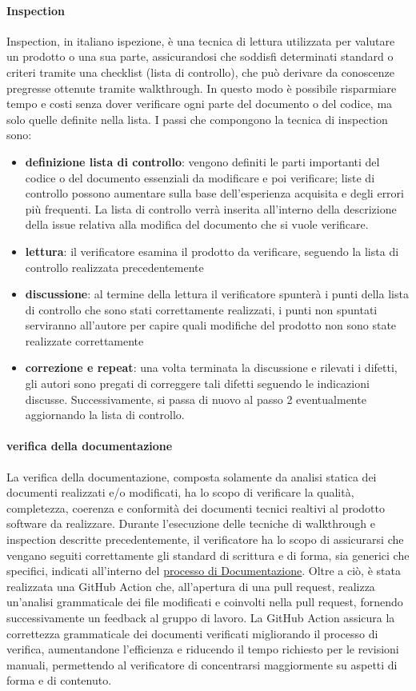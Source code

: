 \paragraph{Inspection}
Inspection, in italiano ispezione, è una tecnica di lettura utilizzata per valutare un prodotto o una sua parte, assicurandosi che soddisfi determinati standard o criteri tramite una checklist (lista di controllo), 
che può derivare da conoscenze pregresse ottenute tramite walkthrough.
In questo modo è possibile risparmiare tempo e costi senza dover verificare ogni parte del documento o del codice, ma solo quelle definite nella lista.
I passi che compongono la tecnica di inspection sono: 
\begin{itemize}
    \item \textbf{definizione lista di controllo}:  vengono definiti le parti importanti del codice o del documento essenziali da modificare e poi verificare; liste di controllo possono aumentare sulla base dell'esperienza acquisita e degli errori più frequenti. 
    La lista di controllo verrà inserita all'interno della descrizione della issue relativa alla modifica del documento che si vuole verificare.
    \item \textbf{lettura}: il verificatore esamina il prodotto da verificare, seguendo la lista di controllo realizzata precedentemente
    \item \textbf{discussione}: al termine della lettura il verificatore spunterà i punti della lista di controllo che sono stati correttamente realizzati, i punti non spuntati serviranno all'autore per capire quali modifiche del prodotto non sono state realizzate correttamente
    \item \textbf{correzione e repeat}:  una volta terminata la discussione e rilevati i difetti, gli autori sono pregati di correggere tali difetti seguendo le indicazioni discusse. Successivamente, si passa di nuovo al passo 2 eventualmente aggiornando la lista di controllo.
\end{itemize}
\paragraph{verifica della documentazione}
La verifica della documentazione, composta solamente da analisi statica dei documenti realizzati e/o modificati, ha lo scopo di verificare
la qualità, completezza, coerenza e conformità dei documenti tecnici realtivi al prodotto software da realizzare.
Durante l'esecuzione delle tecniche di walkthrough e inspection descritte precedentemente, il verificatore ha lo scopo di 
assicurarsi che vengano seguiti correttamente gli standard di scrittura e di forma, sia generici che specifici, indicati all'interno
del \hyperref[subsec:documentazione]{processo di Documentazione}.
Oltre a ciò, è stata realizzata una GitHub Action che, all'apertura di una pull request, realizza un'analisi grammaticale dei file 
modificati e coinvolti nella pull request, fornendo successivamente un feedback al gruppo di lavoro.
La GitHub Action assicura la correttezza grammaticale dei documenti verificati migliorando il processo di verifica, aumentandone l'efficienza 
e riducendo il tempo richiesto per le revisioni manuali, permettendo al verificatore di concentrarsi maggiormente su aspetti 
di forma e di contenuto.
